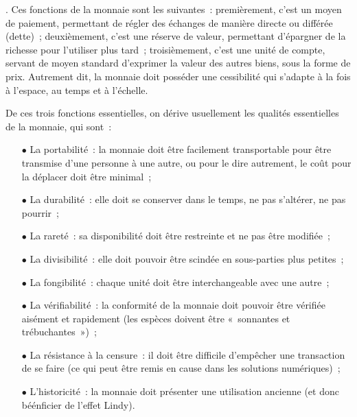 {\begin{quote}
\end{quote}}. Ces fonctions de la monnaie sont les suivantes~: premièrement, c'est un moyen de paiement, permettant de régler des échanges de manière directe ou différée (dette)~; deuxièmement, c'est une réserve de valeur, permettant d'épargner de la richesse pour l'utiliser plus tard~; troisièmement, c'est une unité de compte, servant de moyen standard d'exprimer la valeur des autres biens, sous la forme de prix. Autrement dit, la monnaie doit posséder une cessibilité qui s'adapte à la fois à l'espace, au temps et à l'échelle.

De ces trois fonctions essentielles, on dérive usuellement les qualités essentielles de la monnaie, qui sont~: 

\begin{itemize}
\item[$\bullet$] La portabilité~: la monnaie doit être facilement transportable pour être transmise d'une personne à une autre, ou pour le dire autrement, le coût pour la déplacer doit être minimal~;
\item[$\bullet$] La durabilité~: elle doit se conserver dans le temps, ne pas s'altérer, ne pas pourrir~;
\item[$\bullet$] La rareté~: sa disponibilité doit être restreinte et ne pas être modifiée~;
\item[$\bullet$] La divisibilité~: elle doit pouvoir être scindée en sous-parties plus petites~;
\item[$\bullet$] La fongibilité~: chaque unité doit être interchangeable avec une autre~;
\item[$\bullet$] La vérifiabilité~: la conformité de la monnaie doit pouvoir être vérifiée aisément et rapidement (les espèces doivent être «~sonnantes et trébuchantes~»)~;
\item[$\bullet$] La résistance à la censure~: il doit être difficile d'empêcher une transaction de se faire (ce qui peut être remis en cause dans les solutions numériques)~;
\item[$\bullet$] L'historicité~: la monnaie doit présenter une utilisation ancienne (et donc béénficier de l'effet Lindy).
\end{itemize}

